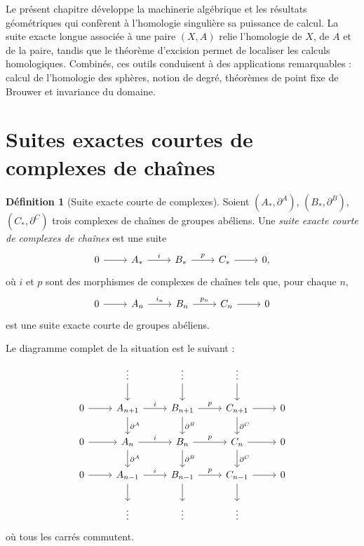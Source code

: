 \documentclass[12pt,a4paper,openany]{book}
\theoremstyle{definition}
\newtheorem{definition}{Définition}[chapter]
\theoremstyle{plain}
\theoremstyle{remark}
\begin{document}
\noindent
Le présent chapitre développe la machinerie algébrique et les résultats géométriques qui
confèrent à l'homologie singulière sa puissance de calcul. La suite exacte longue associée
à une paire $(X, A)$ relie l'homologie de $X$, de $A$ et de la paire, tandis que le théorème
d'excision permet de localiser les calculs homologiques. Combinés, ces outils conduisent à des
applications remarquables : calcul de l'homologie des sphères, notion de degré, théorèmes de
point fixe de Brouwer et invariance du domaine.

\section{Suites exactes courtes de complexes de chaînes}\label{sec:ses-complexes}

\begin{definition}[Suite exacte courte de complexes]\label{def:ses-complexes}
Soient $(A_*, \partial^A)$, $(B_*, \partial^B)$, $(C_*, \partial^C)$ trois complexes de chaînes
de groupes abéliens. Une \emph{suite exacte courte de complexes de chaînes} est une suite
\[
\begin{tikzcd}
  0 \ar[r] & A_* \ar[r, "i"] & B_* \ar[r, "p"] & C_* \ar[r] & 0,
\end{tikzcd}
\]
où $i$ et $p$ sont des morphismes de complexes de chaînes tels que, pour chaque $n$,
\[
\begin{tikzcd}
  0 \ar[r] & A_n \ar[r, "i_n"] & B_n \ar[r, "p_n"] & C_n \ar[r] & 0
\end{tikzcd}
\]
est une suite exacte courte de groupes abéliens.
\end{definition}

Le diagramme complet de la situation est le suivant :
\[
\begin{tikzcd}
  & \vdots \ar[d] & \vdots \ar[d] & \vdots \ar[d] & \\
  0 \ar[r] & A_{n+1} \ar[r, "i"] \ar[d, "\partial^A"] & B_{n+1} \ar[r, "p"] \ar[d, "\partial^B"] & C_{n+1} \ar[r] \ar[d, "\partial^C"] & 0 \\
  0 \ar[r] & A_n \ar[r, "i"] \ar[d, "\partial^A"] & B_n \ar[r, "p"] \ar[d, "\partial^B"] & C_n \ar[r] \ar[d, "\partial^C"] & 0 \\
  0 \ar[r] & A_{n-1} \ar[r, "i"] \ar[d] & B_{n-1} \ar[r, "p"] \ar[d] & C_{n-1} \ar[r] \ar[d] & 0 \\
  & \vdots & \vdots & \vdots &
\end{tikzcd}
\]
où tous les carrés commutent.
\end{document}

